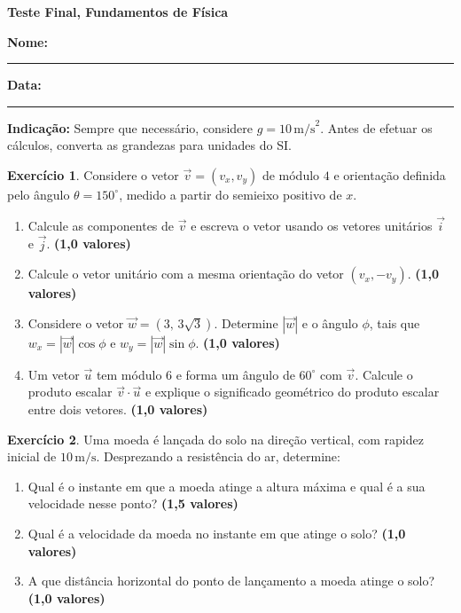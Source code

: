 \documentclass[12pt]{article}
\newcommand{\cabecalho}{
    \hfill
    \begin{minipage}[t]{0.7\textwidth}
        \raggedleft
        \textbf{Teste Final, Fundamentos de Física}
    \end{minipage}
    \vspace{0.35cm}
}
\newcommand{\pontos}[1]{\hfill\textbf{(#1 valores)}}
\begin{document}
\cabecalho

\textbf{Nome:} \rule{10cm}{0.4pt}
\hfill
\textbf{Data:} \rule{2.5cm}{0.4pt}

\vspace{0.2cm}

\textbf{Indicação:} Sempre que necessário, considere $g = 10\,\text{m/s}^2$.
Antes de efetuar os cálculos, converta as grandezas para unidades do SI.

\vspace{0.25cm}

\textbf{Exercício 1}. Considere o vetor $\vec{v}=(v_x,v_y)$ de módulo $4$ e
orientação definida pelo ângulo $\theta=150^\circ$, medido a partir do semieixo positivo
de $x$.

\begin{enumerate}[label=\textbf{\alph*)}]
    \item Calcule as componentes de $\vec{v}$ e escreva o vetor usando os vetores
    unitários $\vec{i}$ e $\vec{j}$. \pontos{1,0}
    \item Calcule o vetor unitário com a mesma orientação do vetor $(v_x,-v_y)$. \pontos{1,0}
    \item Considere o vetor $\vec{w}=(3,\,3\sqrt{3})$. Determine $|\vec{w}|$ e o
    ângulo $\phi$, tais que $w_x=|\vec{w}|\cos\phi$ e
    $w_y=|\vec{w}|\sin\phi$. \pontos{1,0}
    \item Um vetor $\vec{u}$ tem módulo $6$ e forma um ângulo de $60^\circ$ com
    $\vec{v}$. Calcule o produto escalar $\vec{v}\cdot\vec{u}$ e explique o significado
    geométrico do produto escalar entre dois vetores. \pontos{1,0}
\end{enumerate}

\vspace{0.25cm}

\textbf{Exercício 2}. Uma moeda é lançada do solo na direção vertical, com
rapidez inicial de $10\,\text{m/s}$. Desprezando a resistência do ar, determine:

\begin{enumerate}[label=\textbf{\alph*)}]
    \item Qual é o instante em que a moeda atinge a altura máxima e qual é a sua velocidade
    nesse ponto? \pontos{1,5}
    \item Qual é a velocidade da moeda no instante em que atinge o solo? \pontos{1,0}
    \item A que distância horizontal do ponto de lançamento a moeda atinge o solo? \pontos{1,0}
\end{enumerate}
\end{document}
